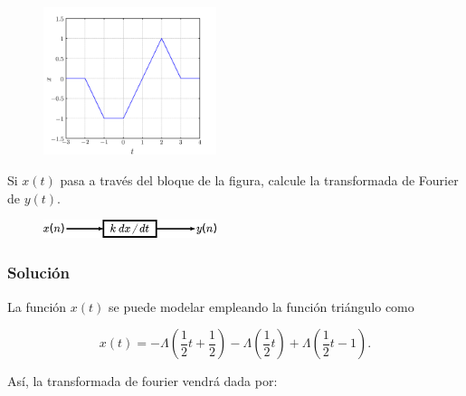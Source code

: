 \documentclass[a4paper,12pt,final]{article}
\begin{document}
      \begin{figure}[H]
        \begin{center}
          \includegraphics[width=0.45\textwidth]{./laboratorio_4/problema02_x.png}
        \end{center}
      \end{figure}

    \noindent Si $x\left(t\right)$ pasa a través del bloque de la figura,
      calcule la transformada de Fourier de $y\left(t\right)$.

      \begin{figure}[H]
        \begin{center}
          \includegraphics[width=0.45\textwidth]{./laboratorio_4/problema02_diagram.png}
        \end{center}
      \end{figure}\vspace{-1.5em}

    \subsubsection*{Solución}

      \noindent La función $x\left(t\right)$ se puede modelar empleando la función triángulo como

        \begin{equation*}
         x\left(t\right) = - \Lambda\left(\frac{1}{2}t + \frac{1}{2}\right)
                           - \Lambda\left(\frac{1}{2}t \right)
                           + \Lambda\left(\frac{1}{2}t - 1\right).
        \end{equation*}

      \noindent Así, la transformada de fourier vendrá dada por:
\end{document}
